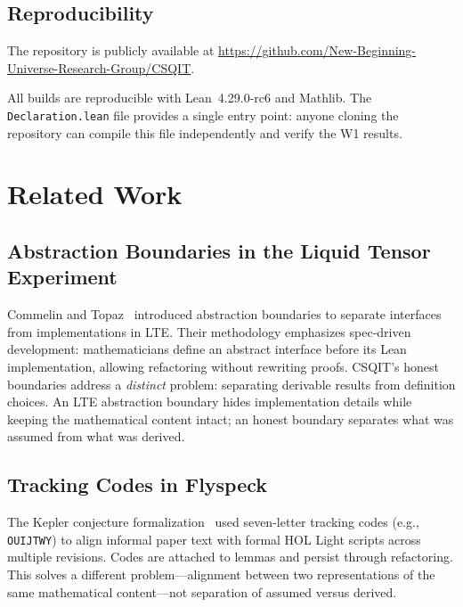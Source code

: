 ﻿\documentclass[11pt]{article}
\begin{document}
\subsection{Reproducibility}
{\sloppy
The repository is publicly available at
\url{https://github.com/New-Beginning-Universe-Research-Group/CSQIT}.
\par}
All builds are reproducible with Lean~4.29.0-rc6 and Mathlib.
The \texttt{Declaration.lean} file provides a single
entry point: anyone cloning the repository can compile this
file independently and verify the W1 results.

\section{Related Work}
\label{sec:related}

\subsection{Abstraction Boundaries in the Liquid Tensor Experiment}
Commelin and Topaz~\cite{commelin2023} introduced abstraction
boundaries to separate interfaces from implementations in
LTE. Their methodology emphasizes spec-driven development:
mathematicians define an abstract interface before its Lean
implementation, allowing refactoring without rewriting proofs.
CSQIT's honest boundaries address a \emph{distinct} problem:
separating derivable results from definition choices. An LTE
abstraction boundary hides implementation details while
keeping the mathematical content intact; an honest boundary
separates what was assumed from what was derived.

\subsection{Tracking Codes in Flyspeck}
The Kepler conjecture formalization~\cite{hales2017} used
seven-letter tracking codes (e.g., \texttt{OUIJTWY}) to
align informal paper text with formal HOL Light scripts
across multiple revisions. Codes are attached to lemmas and
persist through refactoring. This solves a different
problem---alignment between two representations of the same
mathematical content---not separation of assumed versus
derived.
\end{document}
